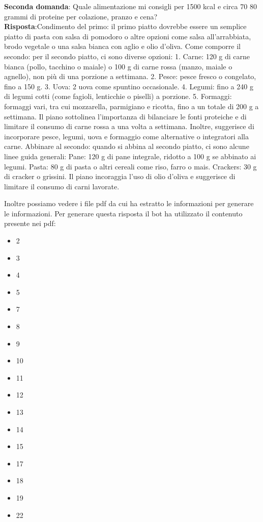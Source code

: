 \documentclass[a4paper,twoside,12pt]{toptesi}
\begin{document}
\textbf{Seconda domanda}: Quale alimentazione mi consigli per 1500 kcal e circa 70 80 grammi di proteine per colazione, pranzo e cena? \\
\textbf{Risposta}:Condimento del primo: il primo piatto dovrebbe essere un semplice piatto di pasta con salsa di pomodoro o altre opzioni come salsa all'arrabbiata, brodo vegetale o una salsa bianca con aglio e olio d'oliva. Come comporre il secondo: per il secondo piatto, ci sono diverse opzioni: 1. Carne: 120 g di carne bianca (pollo, tacchino o maiale) o 100 g di carne rossa (manzo, maiale o agnello), non più di una porzione a settimana. 2. Pesce: pesce fresco o congelato, fino a 150 g. 3. Uova: 2 uova come spuntino occasionale. 4. Legumi: fino a 240 g di legumi cotti (come fagioli, lenticchie o piselli) a porzione. 5. Formaggi: formaggi vari, tra cui mozzarella, parmigiano e ricotta, fino a un totale di 200 g a settimana. Il piano sottolinea l'importanza di bilanciare le fonti proteiche e di limitare il consumo di carne rossa a una volta a settimana. Inoltre, suggerisce di incorporare pesce, legumi, uova e formaggio come alternative o integratori alla carne. Abbinare al secondo: quando si abbina al secondo piatto, ci sono alcune linee guida generali: Pane: 120 g di pane integrale, ridotto a 100 g se abbinato ai legumi. Pasta: 80 g di pasta o altri cereali come riso, farro o mais. Crackers: 30 g di cracker o grissini. Il piano incoraggia l'uso di olio d'oliva e suggerisce di limitare il consumo di carni lavorate.

Inoltre possiamo vedere i file pdf da cui ha estratto le informazioni per generare le informazioni. Per generare questa risposta il bot ha utilizzato il contenuto presente nei pdf:
\begin{itemize}
\item 2
\item 3
\item 4
\item 5
\item 7
\item 8
\item 9
\item 10
\item 11
\item 12
\item 13
\item 14
\item 15
\item 17
\item 18
\item 19
\item 22
\end{itemize}
\end{document}
